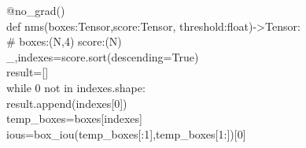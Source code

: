 \begin{frame}
    \large
    @\textcolor{vscodeclass}{no\_grad}\textcolor{vscodebracket}{()}\\
    \vspace{0.2em}
    \textcolor{vscodedef}{def}  \textcolor{vscodefuncation}{nms}\textcolor{vscodebracket}{(}\textcolor{vscodeparameter}{boxes}:\textcolor{vscodeclass}{Tensor},\textcolor{vscodeparameter}{score}:\textcolor{vscodeclass}{Tensor}, \textcolor{vscodeparameter}{threshold}:\textcolor{vscodeclass}{float}\textcolor{vscodebracket}{)}->\textcolor{vscodeclass}{Tensor}:\\
    \vspace{0.2em}
    \qquad\textcolor{vscodecomment}{\# boxes:(N,4) score:(N)}\\
    \vspace{0.2em}
    \qquad\textcolor{vscodeparameter}{\_},\textcolor{vscodeparameter}{indexes}=\textcolor{vscodeparameter}{score}.\textcolor{vscodefuncation}{sort}\textcolor{vscodebracket}{(}\textcolor{vscodeparameter}{descending}=\textcolor{vscodedef}{True}\textcolor{vscodebracket}{)}\\
    \vspace{0.2em}
    \qquad\textcolor{vscodeparameter}{result}=\textcolor{vscodebracket}{[]}\\
    \vspace{0.2em}
    \qquad\textcolor{vscodereturn}{while} \textcolor{vscodecomment}{0} \textcolor{vscodedef}{not in }\textcolor{vscodeparameter}{indexes}.\textcolor{vscodeparameter}{shape}:\\
    \vspace{0.2em}
    \qquad\qquad\textcolor{vscodeparameter}{result}.\textcolor{vscodefuncation}{append}\textcolor{vscodebracket}{(}\textcolor{vscodeparameter}{indexes}\textcolor{vscodecomment}{[0]}\textcolor{vscodebracket}{)}\\
    \vspace{0.2em}
    \qquad\qquad\textcolor{vscodeparameter}{temp\_boxes}=\textcolor{vscodeparameter}{boxes}\textcolor{vscodecomment}{[}\textcolor{vscodeparameter}{indexes}\textcolor{vscodecomment}{]}\\
    \vspace{0.2em}
    \qquad\qquad\textcolor{vscodeparameter}{ious}=\textcolor{vscodefuncation}{box\_iou}\textcolor{vscodebracket}{(}\textcolor{vscodeparameter}{temp\_boxes}\textcolor{vscodecomment}{[}:\textcolor{vscodecomment}{1]},\textcolor{vscodeparameter}{temp\_boxes}\textcolor{vscodecomment}{[1}:\textcolor{vscodecomment}{]}\textcolor{vscodebracket}{)[}\textcolor{vscodecomment}{0}\textcolor{vscodebracket}{]}\\

\end{frame}
